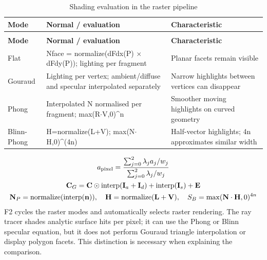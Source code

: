 \documentclass[12pt,a4paper]{article}
\begin{document}
{\small\setlength{\tabcolsep}{4pt}\renewcommand{\arraystretch}{1.12}
\begin{longtable}{>{\raggedright\arraybackslash}p{}>{\raggedright\arraybackslash}p{}>{\raggedright\arraybackslash}p{}}
\caption{Shading evaluation in the raster pipeline}\label{tab:3}\\
\toprule
\textbf{Mode} & \textbf{Normal / evaluation} & \textbf{Characteristic} \\\midrule
\endfirsthead
\multicolumn{3}{l}{\small\itshape Table \thetable{} (continued)}\\
\toprule
\textbf{Mode} & \textbf{Normal / evaluation} & \textbf{Characteristic} \\\midrule
\endhead
\bottomrule\endfoot
Flat & Nface = normalize(dFdx(P) \(\times\) dFdy(P)); lighting per fragment & Planar facets remain visible \\
Gouraud & Lighting per vertex; ambient/diffuse and specular interpolated separately & Narrow highlights between vertices can disappear \\
Phong & Interpolated N normalised per fragment; max(R\(\cdot\)V,0)\textasciicircum{}n & Smoother moving highlights on curved geometry \\
Blinn-Phong & H=normalize(L+V); max(N\(\cdot\)H,0)\textasciicircum{}(4n) & Half-vector highlights; 4n approximates similar width \\
\end{longtable}
}
{\small\begin{equation}\begin{gathered}
a_{\rm pixel}=\frac{\sum_{j=0}^2\lambda_j a_j/w_j}{\sum_{j=0}^2\lambda_j/w_j}\\
\mathbf C_G=\mathbf C\odot\operatorname{interp}(\mathbf I_a+\mathbf I_d)+\operatorname{interp}(\mathbf I_s)+\mathbf E\\
\mathbf N_P=\operatorname{normalize}(\operatorname{interp}(\mathbf n)),\quad
\mathbf H=\operatorname{normalize}(\mathbf L+\mathbf V),\quad S_B=\max(\mathbf N\cdot\mathbf H,0)^{4n}
\end{gathered}\label{eq:11}\end{equation}}
F2 cycles the raster modes and automatically selects raster rendering. The ray tracer shades analytic surface hits per pixel; it can use the Phong or Blinn specular equation, but it does not perform Gouraud triangle interpolation or display polygon facets. This distinction is necessary when explaining the comparison.
\end{document}

